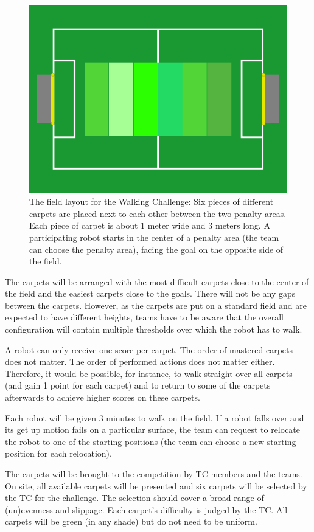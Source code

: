 \documentclass[12pt]{article}
\begin{document}
\begin{figure}[th!]
\centerline{\includegraphics[width=0.6\columnwidth]{figures/walking-challenge}}
\caption{The field layout for the Walking Challenge: Six pieces of different carpets are placed next to each other between the two penalty areas. Each piece of carpet is about 1 meter wide and 3 meters long. A participating robot starts in the center of a penalty area (the team can choose the penalty area), facing the goal on the opposite side of the field.}
\label{fig:walking_challenge}
\end{figure}

The carpets will be arranged with the most difficult carpets close to the center of the field and the easiest carpets close to the goals. There will not be any gaps between the carpets. However, as the carpets are put on a standard field and are expected to have different heights, teams have to be aware that the overall configuration will contain multiple thresholds over which the robot has to walk.

A robot can only receive one score per carpet. The order of mastered carpets does not matter. The order of performed actions does not matter either. Therefore, it would be possible, for instance, to walk straight over all carpets (and gain 1 point for each carpet) and to return to some of the carpets afterwards to achieve higher scores on these carpets.

Each robot will be given 3 minutes to walk on the field. If a robot falls over and its get up motion fails on a particular surface, the team can request to relocate the robot to one of the starting positions (the team can choose a new starting position for each relocation).

The carpets will be brought to the competition by TC members and the teams. On site, all available carpets will be presented and six carpets will be selected by the TC for the challenge. The selection should cover a broad range of (un)evenness and slippage. Each carpet's difficulty is judged by the TC. All carpets will be green (in any shade) but do not need to be uniform.
\end{document}
